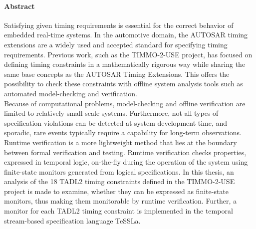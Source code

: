 
\cleardoublepage
\thispagestyle{plain}

\paragraph{Abstract}
Satisfying given timing requirements is essential for the correct behavior of embedded real-time systems.
In the automotive domain, the AUTOSAR timing extensions are a widely used and accepted standard for specifying timing requirements.
Previous work, such as the TIMMO-2-USE project, has focused on defining timing constraints in a mathematically rigorous way while sharing the same base concepts as the AUTOSAR Timing Extensions. This offers the possibility to check these constraints with offline system analysis tools such as automated model-checking and verification.\\
Because of computational problems, model-checking and offline verification are limited to relatively small-scale systems. Furthermore, not all types of specification violations can be detected at system development time, and sporadic, rare events typically require a capability for long-term observations.
Runtime verification is a more lightweight method that lies at the boundary between formal verification and testing. Runtime verification checks properties, expressed in temporal logic, on-the-fly during the operation of the system using finite-state monitors generated from logical specifications. 
In this thesis, an analysis of the 18 TADL2 timing constraints defined in the TIMMO-2-USE project is made to examine, whether they can be expressed as finite-state monitors, thus making them monitorable by runtime verification. Further, a monitor for each TADL2 timing constraint is implemented in the temporal stream-based specification language TeSSLa.

\cleardoublepage
\thispagestyle{plain}

